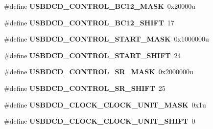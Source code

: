 \begin{DoxyCompactItemize}
\item 
\#define {\bfseries U\+S\+B\+D\+C\+D\+\_\+\+C\+O\+N\+T\+R\+O\+L\+\_\+\+B\+C12\+\_\+\+M\+A\+SK}~0x20000u\hypertarget{group__USBDCD__Register__Masks_ga55366a87bd0cbbbdb98b889e603ff98b}{}\label{group__USBDCD__Register__Masks_ga55366a87bd0cbbbdb98b889e603ff98b}

\item 
\#define {\bfseries U\+S\+B\+D\+C\+D\+\_\+\+C\+O\+N\+T\+R\+O\+L\+\_\+\+B\+C12\+\_\+\+S\+H\+I\+FT}~17\hypertarget{group__USBDCD__Register__Masks_ga156a178bc13853a3d4fc1feef734734e}{}\label{group__USBDCD__Register__Masks_ga156a178bc13853a3d4fc1feef734734e}

\item 
\#define {\bfseries U\+S\+B\+D\+C\+D\+\_\+\+C\+O\+N\+T\+R\+O\+L\+\_\+\+S\+T\+A\+R\+T\+\_\+\+M\+A\+SK}~0x1000000u\hypertarget{group__USBDCD__Register__Masks_ga02bb74c9b2d9fd907d02b72ec4f2dc0c}{}\label{group__USBDCD__Register__Masks_ga02bb74c9b2d9fd907d02b72ec4f2dc0c}

\item 
\#define {\bfseries U\+S\+B\+D\+C\+D\+\_\+\+C\+O\+N\+T\+R\+O\+L\+\_\+\+S\+T\+A\+R\+T\+\_\+\+S\+H\+I\+FT}~24\hypertarget{group__USBDCD__Register__Masks_ga8a353cada7464a5898998c45b2caabb5}{}\label{group__USBDCD__Register__Masks_ga8a353cada7464a5898998c45b2caabb5}

\item 
\#define {\bfseries U\+S\+B\+D\+C\+D\+\_\+\+C\+O\+N\+T\+R\+O\+L\+\_\+\+S\+R\+\_\+\+M\+A\+SK}~0x2000000u\hypertarget{group__USBDCD__Register__Masks_ga7455215193ec55d79026af2e09a7523f}{}\label{group__USBDCD__Register__Masks_ga7455215193ec55d79026af2e09a7523f}

\item 
\#define {\bfseries U\+S\+B\+D\+C\+D\+\_\+\+C\+O\+N\+T\+R\+O\+L\+\_\+\+S\+R\+\_\+\+S\+H\+I\+FT}~25\hypertarget{group__USBDCD__Register__Masks_ga122056290d48016111c0a5e3cb8b63c4}{}\label{group__USBDCD__Register__Masks_ga122056290d48016111c0a5e3cb8b63c4}

\item 
\#define {\bfseries U\+S\+B\+D\+C\+D\+\_\+\+C\+L\+O\+C\+K\+\_\+\+C\+L\+O\+C\+K\+\_\+\+U\+N\+I\+T\+\_\+\+M\+A\+SK}~0x1u\hypertarget{group__USBDCD__Register__Masks_ga7c8eace6dde39098426fe04c6b32bf92}{}\label{group__USBDCD__Register__Masks_ga7c8eace6dde39098426fe04c6b32bf92}

\item 
\#define {\bfseries U\+S\+B\+D\+C\+D\+\_\+\+C\+L\+O\+C\+K\+\_\+\+C\+L\+O\+C\+K\+\_\+\+U\+N\+I\+T\+\_\+\+S\+H\+I\+FT}~0\hypertarget{group__USBDCD__Register__Masks_gae3126a9608c08fe560b91f7b742bb98a}{}\label{group__USBDCD__Register__Masks_gae3126a9608c08fe560b91f7b742bb98a}


\end{DoxyCompactItemize}
